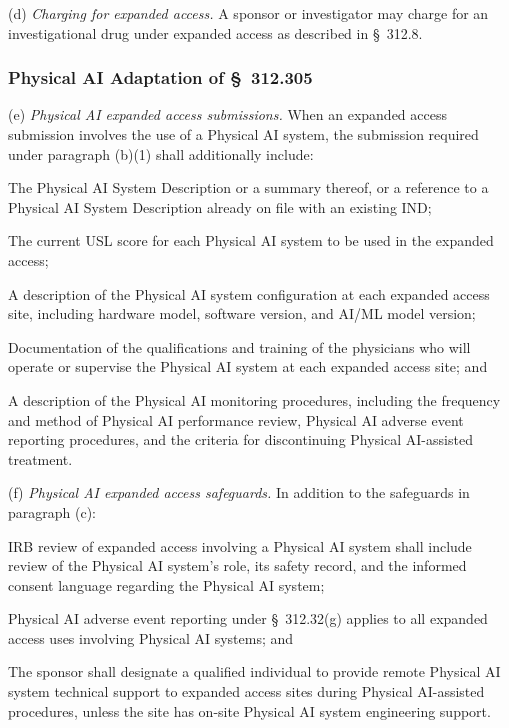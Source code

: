 \documentclass[11pt]{article}
\begin{document}
(d) \textit{Charging for expanded access.} A sponsor or investigator may charge for an investigational drug under expanded access as described in \S~312.8.

\subsubsection{Physical AI Adaptation of \S~312.305}

(e) \textit{Physical AI expanded access submissions.} When an expanded access submission involves the use of a Physical AI system, the submission required under paragraph (b)(1) shall additionally include:

\begin{description}[leftmargin=0.8cm,style=sameline]
\item[(i)] The Physical AI System Description or a summary thereof, or a reference to a Physical AI System Description already on file with an existing IND;
\item[(ii)] The current USL score for each Physical AI system to be used in the expanded access;
\item[(iii)] A description of the Physical AI system configuration at each expanded access site, including hardware model, software version, and AI/ML model version;
\item[(iv)] Documentation of the qualifications and training of the physicians who will operate or supervise the Physical AI system at each expanded access site; and
\item[(v)] A description of the Physical AI monitoring procedures, including the frequency and method of Physical AI performance review, Physical AI adverse event reporting procedures, and the criteria for discontinuing Physical AI-assisted treatment.
\end{description}

(f) \textit{Physical AI expanded access safeguards.} In addition to the safeguards in paragraph (c):

\begin{description}[leftmargin=0.8cm,style=sameline]
\item[(i)] IRB review of expanded access involving a Physical AI system shall include review of the Physical AI system's role, its safety record, and the informed consent language regarding the Physical AI system;
\item[(ii)] Physical AI adverse event reporting under \S~312.32(g) applies to all expanded access uses involving Physical AI systems; and
\item[(iii)] The sponsor shall designate a qualified individual to provide remote Physical AI system technical support to expanded access sites during Physical AI-assisted procedures, unless the site has on-site Physical AI system engineering support.
\end{description}
\end{document}
